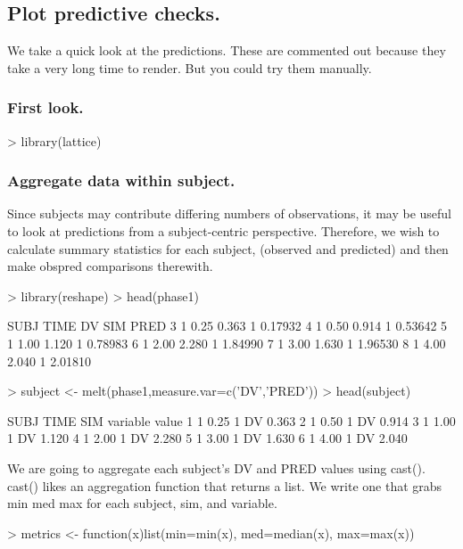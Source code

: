 \subsection{Plot predictive checks.}
We take a quick look at the predictions.  These are commented out because
they take a very long time to render.  But you could try them manually.
\subsubsection{First look.}
\begin{Schunk}
\begin{Sinput}
> library(lattice)
\end{Sinput}
\end{Schunk}
\subsubsection{Aggregate data within subject.}
Since subjects may contribute differing numbers of observations, it may
be useful to look at predictions from a subject-centric perspective.
Therefore, we wish to calculate summary statistics for each subject, 
(observed and predicted) and then make obspred comparisons therewith.
\begin{Schunk}
\begin{Sinput}
> library(reshape)
> head(phase1)
\end{Sinput}
\begin{Soutput}
  SUBJ TIME    DV SIM    PRED
3    1 0.25 0.363   1 0.17932
4    1 0.50 0.914   1 0.53642
5    1 1.00 1.120   1 0.78983
6    1 2.00 2.280   1 1.84990
7    1 3.00 1.630   1 1.96530
8    1 4.00 2.040   1 2.01810
\end{Soutput}
\begin{Sinput}
> subject <- melt(phase1,measure.var=c('DV','PRED'))
> head(subject)
\end{Sinput}
\begin{Soutput}
  SUBJ TIME SIM variable value
1    1 0.25   1       DV 0.363
2    1 0.50   1       DV 0.914
3    1 1.00   1       DV 1.120
4    1 2.00   1       DV 2.280
5    1 3.00   1       DV 1.630
6    1 4.00   1       DV 2.040
\end{Soutput}
\end{Schunk}
We are going to aggregate each subject's DV and PRED values using cast().
cast() likes an aggregation function that returns a list.
We write one that grabs min med max for each subject, sim, and variable.
\begin{Schunk}
\begin{Sinput}
> metrics <- function(x)list(min=min(x), med=median(x), max=max(x))
\end{Sinput}
\end{Schunk}
